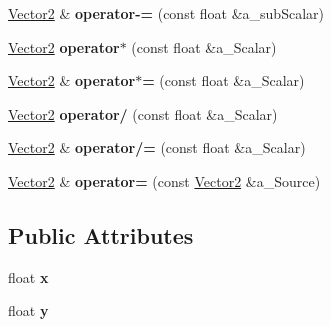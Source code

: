 \begin{DoxyCompactItemize}
\item 
\hypertarget{class_ai_math_1_1_vector2_a89aeb317542fcb6534dcb861838895a5}{\hyperlink{class_ai_math_1_1_vector2}{Vector2} \& {\bfseries operator-\/=} (const float \&a\+\_\+sub\+Scalar)}\label{class_ai_math_1_1_vector2_a89aeb317542fcb6534dcb861838895a5}

\item 
\hypertarget{class_ai_math_1_1_vector2_abb61b04d9a18ab894fb973fc4634c4ba}{\hyperlink{class_ai_math_1_1_vector2}{Vector2} {\bfseries operator$\ast$} (const float \&a\+\_\+\+Scalar)}\label{class_ai_math_1_1_vector2_abb61b04d9a18ab894fb973fc4634c4ba}

\item 
\hypertarget{class_ai_math_1_1_vector2_abc3abcf1bbe9192b513c0e4545356dd8}{\hyperlink{class_ai_math_1_1_vector2}{Vector2} \& {\bfseries operator$\ast$=} (const float \&a\+\_\+\+Scalar)}\label{class_ai_math_1_1_vector2_abc3abcf1bbe9192b513c0e4545356dd8}

\item 
\hypertarget{class_ai_math_1_1_vector2_ab96bbf711e52395b15673bdb46d79bc8}{\hyperlink{class_ai_math_1_1_vector2}{Vector2} {\bfseries operator/} (const float \&a\+\_\+\+Scalar)}\label{class_ai_math_1_1_vector2_ab96bbf711e52395b15673bdb46d79bc8}

\item 
\hypertarget{class_ai_math_1_1_vector2_a592007cc361b815e8cb0a47bc6a21138}{\hyperlink{class_ai_math_1_1_vector2}{Vector2} \& {\bfseries operator/=} (const float \&a\+\_\+\+Scalar)}\label{class_ai_math_1_1_vector2_a592007cc361b815e8cb0a47bc6a21138}

\item 
\hypertarget{class_ai_math_1_1_vector2_a640eb9c54aa6e45d7d42f857d14d3665}{\hyperlink{class_ai_math_1_1_vector2}{Vector2} \& {\bfseries operator=} (const \hyperlink{class_ai_math_1_1_vector2}{Vector2} \&a\+\_\+\+Source)}\label{class_ai_math_1_1_vector2_a640eb9c54aa6e45d7d42f857d14d3665}

\end{DoxyCompactItemize}
\subsection*{Public Attributes}
\begin{DoxyCompactItemize}
\item 
\hypertarget{class_ai_math_1_1_vector2_aee104e356477d9fc2a87cb8e10851805}{float {\bfseries x}}\label{class_ai_math_1_1_vector2_aee104e356477d9fc2a87cb8e10851805}

\item 
\hypertarget{class_ai_math_1_1_vector2_ae97b60692e3f2e037b02030190c55174}{float {\bfseries y}}\label{class_ai_math_1_1_vector2_ae97b60692e3f2e037b02030190c55174}

\end{DoxyCompactItemize}
